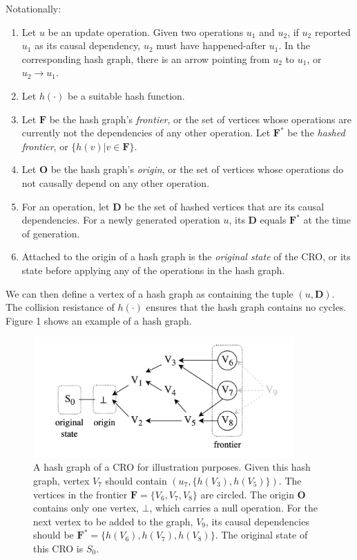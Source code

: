 \documentclass{article}
\begin{document}
Notationally:
\begin{enumerate}
    \item Let $u$ be an update operation. Given two operations $u_1$ and $u_2$, if $u_2$ reported $u_1$ as its causal dependency, $u_2$ must have happened-after $u_1$. In the corresponding hash graph, there is an arrow pointing from $u_2$ to $u_1$, or $u_2 \rightarrow u_1$.
    \item Let $h(\cdot)$ be a suitable hash function.
    \item Let $\textbf{F}$ be the hash graph's \textit{frontier}, or the set of vertices whose operations are currently not the dependencies of any other operation. Let $\textbf{F}^*$ be the \textit{hashed frontier}, or $\{h(v) | v \in \textbf{F}\}$.
    \item Let $\textbf{O}$ be the hash graph's \textit{origin}, or the set of vertices whose operations do not causally depend on any other operation.
    \item For an operation, let $\textbf{D}$ be the set of hashed vertices that are its causal dependencies. For a newly generated operation $u$, its $\textbf{D}$ equals $\textbf{F}^*$ at the time of generation.
    \item Attached to the origin of a hash graph is the \textit{original state} of the CRO, or its state before applying any of the operations in the hash graph.
\end{enumerate}
We can then define a vertex of a hash graph as containing the tuple $(u, \textbf{D})$. The collision resistance of $h(\cdot)$ ensures that the hash graph contains no cycles. Figure 1 shows an example of a hash graph.

\begin{figure}[htp]
    \centering
    \includegraphics[width=10cm]{fig1}
    \caption{A hash graph of a CRO for illustration purposes. Given this hash graph, vertex $V_7$ should contain $(u_7, \{h(V_3),h(V_5)\})$. The vertices in the frontier $\textbf{F} = \{V_6, V_7, V_8\}$ are circled. The origin $\textbf{O}$ contains only one vertex, $\bot$, which carries a null operation. For the next vertex to be added to the graph, $V_9$, its causal dependencies should be $\textbf{F}^* = \{h(V_6), h(V_7), h(V_8)\}$. The original state of this CRO is $S_0$.}
    \label{fig:1}
\end{figure}
\end{document}
